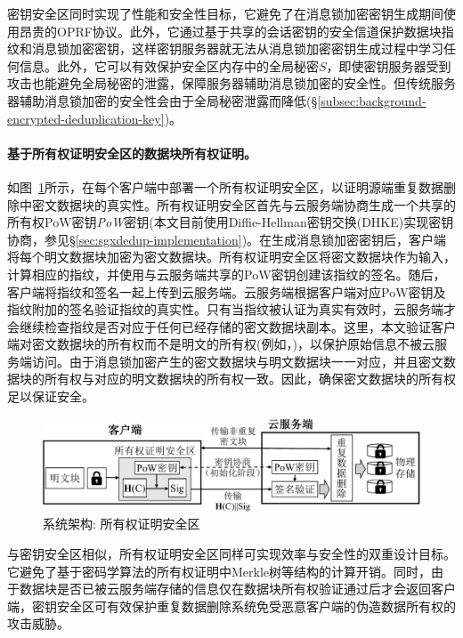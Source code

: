 密钥安全区同时实现了性能和安全性目标，它避免了在消息锁加密密钥生成期间使用昂贵的OPRF协议\cite{bellare2013DupLESS}。此外，它通过基于共享的会话密钥的安全信道保护数据块指纹和消息锁加密密钥，这样密钥服务器就无法从消息锁加密密钥生成过程中学习任何信息。此外，它可以有效保护安全区内存中的全局秘密$S$，即使密钥服务器受到攻击也能避免全局秘密的泄露，保障服务器辅助消息锁加密的安全性。但传统服务器辅助消息锁加密的安全性会由于全局秘密泄露而降低(\S\ref{subsec:background-encrypted-deduplication-key})。



\paragraph*{基于所有权证明安全区的数据块所有权证明。}如图~\ref{fig:sgxdedup-overview-pow}所示，\sysnameS 在每个客户端中部署一个所有权证明安全区，以证明源端重复数据删除中密文数据块的真实性。所有权证明安全区首先与云服务端协商生成一个共享的所有权PoW密钥\textit{PoW}密钥(本文目前使用Diffie-Hellman密钥交换(DHKE)实现密钥协商，参见\S\ref{sec:sgxdedup-implementation})。在生成消息锁加密密钥后，客户端将每个明文数据块加密为密文数据块。所有权证明安全区将密文数据块作为输入，计算相应的指纹，并使用与云服务端共享的PoW密钥创建该指纹的签名。随后，客户端将指纹和签名一起上传到云服务端。云服务端根据客户端对应PoW密钥及指纹附加的签名验证指纹的真实性。只有当指纹被认证为真实有效时，云服务端才会继续检查指纹是否对应于任何已经存储的密文数据块副本。这里，本文验证客户端对密文数据块的所有权而不是明文的所有权(例如，\cite{halevi11})，以保护原始信息不被云服务端访问。由于消息锁加密产生的密文数据块与明文数据块一一对应，并且密文数据块的所有权与对应的明文数据块的所有权一致。因此，确保密文数据块的所有权足以保证安全。

\begin{figure}[!htb]
    \centering
    \includegraphics[width=\textwidth]{pic/sgxdedup/pow.pdf}
    \caption{\sysnameS 系统架构: 所有权证明安全区}
    \label{fig:sgxdedup-overview-pow}
\end{figure}


与密钥安全区相似，所有权证明安全区同样可实现效率与安全性的双重设计目标。它避免了基于密码学算法的所有权证明中Merkle树等结构的计算开销。同时，由于数据块是否已被云服务端存储的信息仅在数据块所有权验证通过后才会返回客户端，密钥安全区可有效保护重复数据删除系统免受恶意客户端的伪造数据所有权的攻击威胁。

